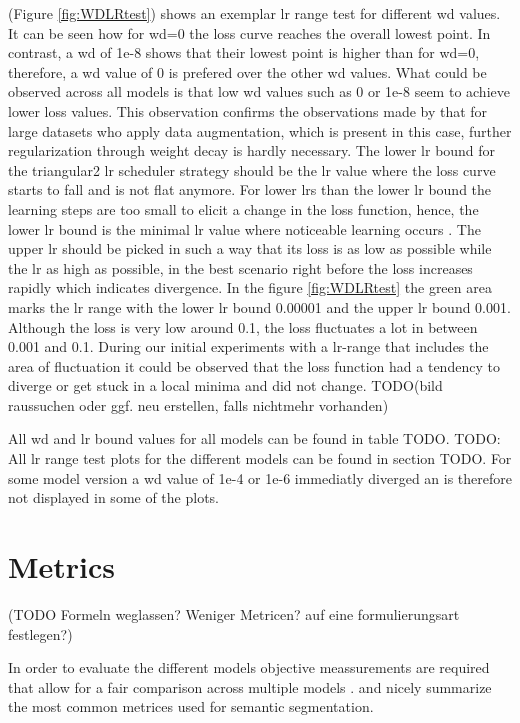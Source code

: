 \documentclass[11pt,
  paper=a4, 
  bibliography=totocnumbered,
	captions=tableheading,
	BCOR=10mm
]{scrreprt}
\theoremstyle{definition}
\newcommand{\figref}[1]{(Figure \ref{#1})}
\begin{document}
\figref{fig:WDLRtest} shows an exemplar \gls{lr} range test for different \gls{wd} values.
It can be seen how for \gls{wd}=0 the loss curve reaches the overall lowest point.
In contrast, a \gls{wd} of 1e-8 shows that their lowest point is higher than for \gls{wd}=0, therefore, a \gls{wd} value of 0 is prefered over the other \gls{wd} values.
What could be observed across all models is that low \gls{wd} values such as 0 or 1e-8 seem to achieve lower loss values.
This observation confirms the observations made by \textcite{Hernandez-Garcia2018} that for large datasets who apply data augmentation, which is present in this case, further regularization through weight decay is hardly necessary.
The lower \gls{lr} bound for the triangular2 \gls{lr} scheduler strategy should be the \gls{lr} value where the loss curve starts to fall and is not flat anymore.
For lower \glspl{lr} than the lower \gls{lr} bound the learning steps are too small to elicit a change in the loss function, hence, the lower \gls{lr} bound is the minimal \gls{lr} value where noticeable learning occurs \cite{Smith2018}.
The upper \gls{lr} should be picked in such a way that its loss is as low as possible while the \gls{lr} as high as possible, in the best scenario right before the loss increases rapidly which indicates divergence.
In the figure \ref{fig:WDLRtest} the green area marks the \gls{lr} range with the lower \gls{lr} bound 0.00001 and the upper \gls{lr} bound 0.001.
Although the loss is very low around 0.1, the loss fluctuates a lot in between 0.001 and 0.1.
During our initial experiments with a lr-range that includes the area of fluctuation it could be observed that the loss function had a tendency to diverge or get stuck in a local minima and did not change. TODO(bild raussuchen oder ggf. neu erstellen, falls nichtmehr vorhanden)


All \gls{wd} and \gls{lr} bound values for all models can be found in table TODO.
TODO: All \gls{lr} range test plots for the different models can be found in section TODO.
For some model version a \gls{wd} value of 1e-4 or 1e-6 immediatly diverged an is therefore not displayed in some of the plots.

\section{Metrics}

(TODO Formeln weglassen? Weniger Metricen? auf eine formulierungsart festlegen?)

In order to evaluate the different models objective meassurements are required that allow for a fair comparison across multiple models \cite{Garcia-Garcia2018}. 
\textcite{Minaee2020} and \textcite{Garcia-Garcia2018} nicely summarize the most common metrices used for semantic segmentation.
\end{document}
